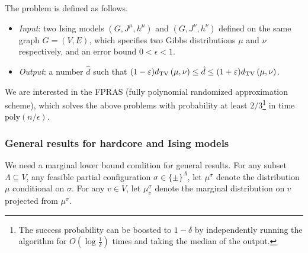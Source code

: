 \begin{problem}\label{label:prob-Ising} 
The problem is defined as follows.
\begin{itemize}
    \item \emph{Input}: two Ising models $(G,J^\mu,h^\mu)$ and $(G,J^\nu,h^\nu)$ defined on the same graph $G = (V,E)$, which specifies two Gibbs distributions $\mu$ and $\nu$ respectively, and an error bound $0<\epsilon<1$.
    \item \emph{Output}: a number $\hat{d}$ such that $(1-\varepsilon) d_{\mathrm{TV}}\left({\mu},{\nu}\right) \leq \hat{d} \leq (1 + \varepsilon)d_{\mathrm{TV}}\left({\mu},{\nu}\right)$.
\end{itemize}
\end{problem}




We are interested in the FPRAS (fully polynomial randomized approximation scheme), which solves the above problems with probability at least $2/3$\footnote{The success probability can be boosted to $1-\delta$ by independently running the algorithm for $O(\log \frac{1}{\delta})$ times and taking the median of the output.} in time $\mathrm{poly}({n}/{\epsilon})$.

\subsubsection{General results for hardcore and Ising models}

We need a marginal lower bound condition for general results. %
For any subset $\Lambda \subseteq V$, any feasible partial configuration $\sigma \in \{\pm\}^\Lambda$, let $\mu^\sigma$ denote the distribution $\mu$ conditional on $\sigma$. 
For any $v \in V$, let $\mu^\sigma_v$ denote the marginal distribution on $v$ projected from  $\mu^\sigma$.

